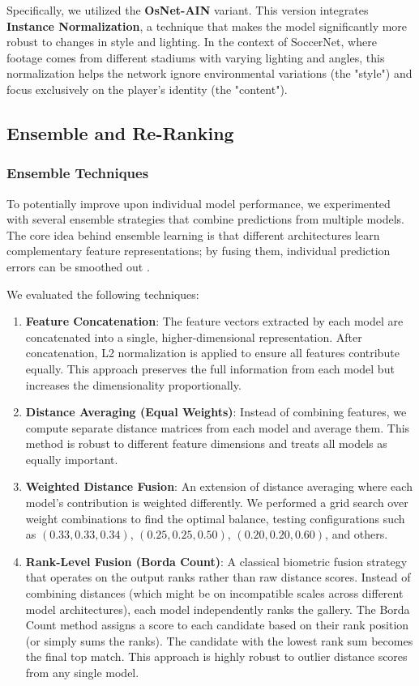 \documentclass[10pt,twocolumn,letterpaper]{article}
\begin{document}
Specifically, we utilized the \textbf{OsNet-AIN} \cite{osnet_ain} variant. This version integrates \textbf{Instance Normalization}, a technique that makes the model significantly more robust to changes in style and lighting. In the context of SoccerNet, where footage comes from different stadiums with varying lighting and angles, this normalization helps the network ignore environmental variations (the "style") and focus exclusively on the player's identity (the "content").

\subsection{Ensemble and Re-Ranking}

\subsubsection{Ensemble Techniques}
To potentially improve upon individual model performance, we experimented with several ensemble strategies that combine predictions from multiple models. The core idea behind ensemble learning is that different architectures learn complementary feature representations; by fusing them, individual prediction errors can be smoothed out \cite{ensemble_diversity}.

We evaluated the following techniques:

\begin{enumerate}
    \item \textbf{Feature Concatenation}: The feature vectors extracted by each model are concatenated into a single, higher-dimensional representation. After concatenation, L2 normalization is applied to ensure all features contribute equally. This approach preserves the full information from each model but increases the dimensionality proportionally.
    
    \item \textbf{Distance Averaging (Equal Weights)}: Instead of combining features, we compute separate distance matrices from each model and average them. This method is robust to different feature dimensions and treats all models as equally important.
    
    \item \textbf{Weighted Distance Fusion}: An extension of distance averaging where each model's contribution is weighted differently. We performed a grid search over weight combinations to find the optimal balance, testing configurations such as $(0.33, 0.33, 0.34)$, $(0.25, 0.25, 0.50)$, $(0.20, 0.20, 0.60)$, and others.

    \item \textbf{Rank-Level Fusion (Borda Count)}: A classical biometric fusion strategy that operates on the output ranks rather than raw distance scores. Instead of combining distances (which might be on incompatible scales across different model architectures), each model independently ranks the gallery. The Borda Count method assigns a score to each candidate based on their rank position (or simply sums the ranks). The candidate with the lowest rank sum becomes the final top match. This approach is highly robust to outlier distance scores from any single model.
\end{enumerate}
\end{document}
